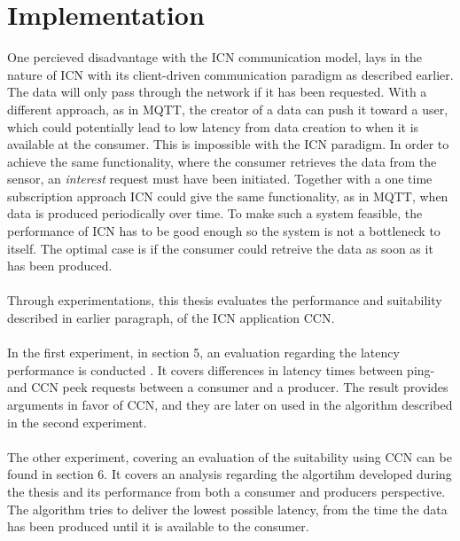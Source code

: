 \section{Implementation}
One percieved disadvantage with the ICN communication model, lays in the nature of ICN with its client-driven communication paradigm as described earlier. The data will only pass through the network if it has been requested. With a different approach, as in MQTT, the creator of a data can push it toward a user, which could potentially lead to low latency from data creation to when it is available at the consumer. This is impossible with the ICN paradigm. 
In order to achieve the same functionality, where the consumer retrieves the data from the sensor, an \textit{interest} request must have been initiated. Together with a one time subscription approach ICN could give the same functionality, as in MQTT, when data is produced periodically over time. To make such a system feasible, the performance of ICN has to be good enough so the system is not a bottleneck to itself. The optimal case is if the consumer could retreive the data as soon as it has been produced.\\\\
Through experimentations, this thesis evaluates the performance and suitability described in earlier paragraph, of the ICN application CCN.\\\\
In the first experiment, in section 5, an evaluation regarding the latency performance is conducted . It covers differences in latency times between ping- and CCN peek requests between a consumer and a producer. The result provides arguments in favor of CCN, and they are later on used in the algorithm described in the second experiment.\\\\
The other experiment, covering an evaluation of the suitability using CCN can be found in section 6. It covers an analysis regarding the algortihm developed during the thesis and its performance from both a consumer and producers perspective. The algorithm tries to deliver the lowest possible latency, from the time the data has been produced until it is available to the consumer. 


